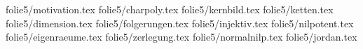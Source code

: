 %
%
%
folie{5/motivation.tex}
folie{5/charpoly.tex}
folie{5/kernbild.tex}
folie{5/ketten.tex}
folie{5/dimension.tex}
folie{5/folgerungen.tex}
folie{5/injektiv.tex}
folie{5/nilpotent.tex}
folie{5/eigenraeume.tex}
folie{5/zerlegung.tex}
folie{5/normalnilp.tex}
folie{5/jordan.tex}
